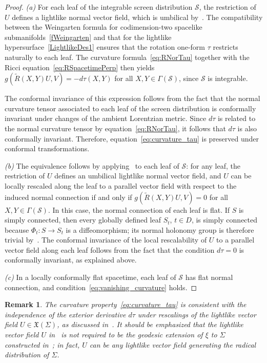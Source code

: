 \documentclass[11pt]{article}
\numberwithin{equation}{section}
\newtheorem{remark}[theorem]{Remark}
\begin{document}
\begin{proof}
	\emph{(a)} For each leaf of the integrable screen distribution $\mathcal{S}$, the restriction of $U$ defines a lightlike normal vector field, which is umbilical by~. The compatibility between the Weingarten formula for codimension-two spacelike submanifolds~\eqref{fWeingarten} and that for the lightlike hypersurface~\eqref{LightlikeDes1} ensures that the rotation one-form $\tau$ restricts naturally to each leaf. The curvature formula~\eqref{eq:RNorTau} together with the Ricci equation~\eqref{eq:RSpacetimePerp} then yields $g(\widetilde{R}(X,Y)U,V) = -d\tau(X,Y)$ for all $X, Y \in \Gamma(\mathcal{S})$, since $\mathcal{S}$ is integrable. 
	
The conformal invariance of this expression follows from the fact that the normal curvature tensor associated to each leaf of the screen distribution is conformally invariant under changes of the ambient Lorentzian metric. Since $d\tau$ is related to the normal curvature tensor by equation~\eqref{eq:RNorTau}, it follows that $d\tau$ is also conformally invariant. Therefore, equation~\eqref{eq:curvature_tau} is preserved under conformal transformations.
	
	\emph{(b)} The equivalence follows by applying~ to each leaf of $\mathcal{S}$: for any leaf, the restriction of $U$ defines an umbilical lightlike normal vector field, and $U$ can be locally rescaled along the leaf to a parallel vector field with respect to the induced normal connection if and only if $g(\widetilde{R}(X,Y)U,V) = 0$ for all $X, Y \in \Gamma(\mathcal{S})$. In this case, the normal connection of each leaf is flat. If $S$ is simply connected, then every globally defined leaf $S_t$, $t\in D$, is simply connected because $\Phi_t\colon S\to S_t$ is a diffeomorphism; its normal holonomy group is therefore trivial by~. The conformal invariance of the local rescalability of $U$ to a parallel vector field along each leaf follows from the fact that the condition $d\tau = 0$ is conformally invariant, as explained above.
	
	\emph{(c)} In a locally conformally flat spacetime, each leaf of $\mathcal{S}$ has flat normal connection, and condition~\eqref{eq:vanishing_curvature} holds.
\end{proof}

\begin{remark}\normalfont
	The curvature property~\eqref{eq:curvature_tau} is consistent with the independence of the exterior derivative $d\tau$ under rescalings of the lightlike vector field $U \in \mathfrak{X}(\Sigma)$, as discussed in~. It should be emphasized that the lightlike vector field $U$ in~ is not required to be the geodesic extension of $\xi$ to $\Sigma$ constructed in~; in fact, $U$ can be any lightlike vector field generating the radical distribution of $\Sigma$.
\end{remark}
\end{document}
